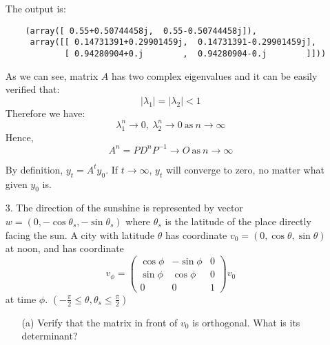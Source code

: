 \documentclass{article}
\begin{document}
\begin{enumerate}
    The output is:
    
    \begin{verbatim}
    (array([ 0.55+0.50744458j,  0.55-0.50744458j]),
     array([[ 0.14731391+0.29901459j,  0.14731391-0.29901459j],
            [ 0.94280904+0.j        ,  0.94280904-0.j        ]]))
    \end{verbatim}
    
    As we can see, matrix $A$ has two complex eigenvalues and it can be easily verified that:
    $$ |\lambda_1| = |\lambda_2| < 1 $$
    Therefore we have:
    $$ \lambda_1^n \rightarrow 0,\ \lambda_2^n \rightarrow 0\ \textrm{as}\ n \rightarrow \infty $$
    Hence,
    $$ A^n = PD^nP^{-1} \rightarrow O\ \textrm{as}\ n \rightarrow \infty $$
    
    By definition, $y_{t}=A^t y_0$. If $t \rightarrow \infty$, $y_t$ will converge to zero, no matter what given $y_0$ is. \\
    
    
    \item[3.] The direction of the sunshine is represented by vector $w = (0,-\cos\theta_s,-\sin\theta_s)$ where $\theta_s$ is the latitude of the place directly facing the sun. A city with latitude $\theta$ has coordinate $v_0 = (0,\cos\theta,\sin\theta)$ at noon, and has coordinate 
    $$ v_\phi = 
        \begin{pmatrix} 
            \cos\phi &-\sin\phi &0 \\ 
            \sin\phi &\cos\phi &0 \\ 
            0 &0 &1 
        \end{pmatrix} v_0 $$
    at time $\phi$. $\left( -\frac{\pi}{2} \leq \theta, \theta_s \leq \frac{\pi}{2} \right)$
    
    \begin{enumerate}
        \item[(a)] Verify that the matrix in front of $v_0$ is orthogonal. What is its determinant? \\
        

\end{enumerate}
\end{enumerate}
\end{document}
